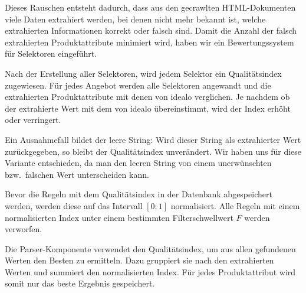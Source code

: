 Dieses Rauschen entsteht dadurch, dass aus den gecrawlten HTML-Dokumenten viele Daten extrahiert werden,
bei denen nicht mehr bekannt ist, welche extrahierten Informationen korrekt oder falsch sind.
Damit die Anzahl der falsch extrahierten Produktattribute minimiert wird, haben wir ein Bewertungssystem für
Selektoren eingeführt.

Nach der Erstellung aller Selektoren, wird jedem Selektor ein Qualitätsindex zugewiesen.
Für jedes Angebot werden alle Selektoren angewandt und die extrahierten Produktattribute mit denen von idealo
verglichen.
Je nachdem ob der extrahierte Wert mit dem von idealo übereinstimmt, wird der Index erhöht oder verringert.

Ein Ausnahmefall bildet der leere String: Wird dieser String als extrahierter Wert zurückgegeben, so bleibt der
Qualitätsindex unverändert.
Wir haben uns für diese Variante entschieden, da man den leeren String von einem unerwünschten bzw.\
falschen Wert unterscheiden kann.

Bevor die Regeln mit dem Qualitätsindex in der Datenbank abgespeichert werden, werden diese auf das Intervall $[0; 1]$
normalisiert.
Alle Regeln mit einem normalisierten Index unter einem bestimmten Filterschwellwert $F$ werden verworfen.

Die Parser-Komponente verwendet den Qualitätsindex, um aus allen gefundenen Werten den Besten zu ermitteln.
Dazu gruppiert sie nach den extrahierten Werten und summiert den normalisierten Index.
Für jedes Produktattribut wird somit nur das beste Ergebnis gespeichert.